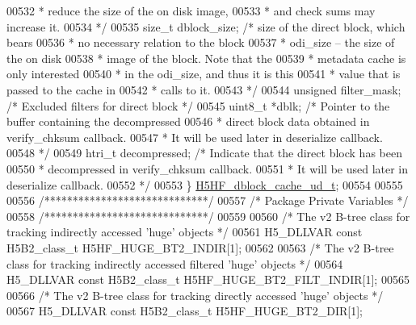 \begin{DoxyCode}
00532 \textcolor{comment}{                 * reduce the size of the on disk image,}
00533 \textcolor{comment}{                 * and check sums may increase it.}
00534 \textcolor{comment}{                 */}
00535     \textcolor{keywordtype}{size\_t} dblock\_size;     \textcolor{comment}{/* size of the direct block, which bears}
00536 \textcolor{comment}{                 * no necessary relation to the block}
00537 \textcolor{comment}{                 * odi\_size -- the size of the on disk}
00538 \textcolor{comment}{                 * image of the block.  Note that the}
00539 \textcolor{comment}{                 * metadata cache is only interested}
00540 \textcolor{comment}{                 * in the odi\_size, and thus it is this}
00541 \textcolor{comment}{                 * value that is passed to the cache in}
00542 \textcolor{comment}{                 * calls to it.}
00543 \textcolor{comment}{                 */}
00544     \textcolor{keywordtype}{unsigned} filter\_mask;   \textcolor{comment}{/* Excluded filters for direct block */}
00545     uint8\_t *dblk;  \textcolor{comment}{/* Pointer to the buffer containing the decompressed}
00546 \textcolor{comment}{                     * direct block data obtained in verify\_chksum callback.}
00547 \textcolor{comment}{                     * It will be used later in deserialize callback.}
00548 \textcolor{comment}{                     */}
00549     htri\_t decompressed;    \textcolor{comment}{/* Indicate that the direct block has been}
00550 \textcolor{comment}{                             * decompressed in verify\_chksum callback.}
00551 \textcolor{comment}{                             * It will be used later in deserialize callback.}
00552 \textcolor{comment}{                             */}
00553 \} \hyperlink{struct_h5_h_f__dblock__cache__ud__t}{H5HF\_dblock\_cache\_ud\_t};
00554 
00555 
00556 \textcolor{comment}{/*****************************/}
00557 \textcolor{comment}{/* Package Private Variables */}
00558 \textcolor{comment}{/*****************************/}
00559 
00560 \textcolor{comment}{/* The v2 B-tree class for tracking indirectly accessed 'huge' objects */}
00561 H5\_DLLVAR \textcolor{keyword}{const} H5B2\_class\_t H5HF\_HUGE\_BT2\_INDIR[1];
00562 
00563 \textcolor{comment}{/* The v2 B-tree class for tracking indirectly accessed filtered 'huge' objects */}
00564 H5\_DLLVAR \textcolor{keyword}{const} H5B2\_class\_t H5HF\_HUGE\_BT2\_FILT\_INDIR[1];
00565 
00566 \textcolor{comment}{/* The v2 B-tree class for tracking directly accessed 'huge' objects */}
00567 H5\_DLLVAR \textcolor{keyword}{const} H5B2\_class\_t H5HF\_HUGE\_BT2\_DIR[1];

\end{DoxyCode}
